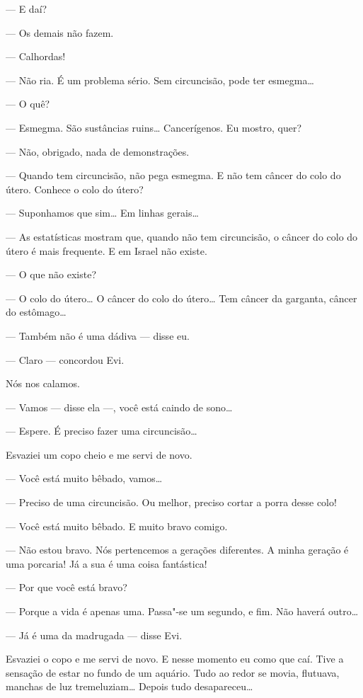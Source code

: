 --- E daí?

--- Os demais não fazem.

--- Calhordas!

--- Não ria. É um problema sério. Sem circuncisão, pode ter
esmegma\ldots{}

--- O quê?

--- Esmegma. São sustâncias ruins\ldots{} Cancerígenos. Eu mostro,
quer?

--- Não, obrigado, nada de demonstrações.

--- Quando tem circuncisão, não pega esmegma. E não tem câncer do
colo do útero. Conhece o colo do útero?

--- Suponhamos que sim\ldots{} Em linhas gerais\ldots{}

--- As estatísticas mostram que, quando não tem circuncisão, o
câncer do colo do útero é mais frequente. E em Israel não existe.

--- O que não existe?

--- O colo do útero\ldots{} O câncer do colo do útero\ldots{} Tem câncer da
garganta, câncer do estômago\ldots{}

--- Também não é uma dádiva --- disse eu.

--- Claro --- concordou Evi.

Nós nos calamos.

--- Vamos --- disse ela ---, você está caindo de
sono\ldots{}

--- Espere. É preciso fazer uma circuncisão\ldots{}

Esvaziei um copo cheio e me servi de novo.

--- Você está muito bêbado, vamos\ldots{}

--- Preciso de uma circuncisão. Ou melhor, preciso cortar a porra
desse colo!

--- Você está muito bêbado. E muito bravo comigo.

--- Não estou bravo. Nós pertencemos a gerações diferentes. A
minha geração é uma porcaria! Já a sua é uma coisa fantástica!

--- Por que você está bravo?

--- Porque a vida é apenas uma. Passa"-se um segundo, e fim. Não
haverá outro\ldots{}

--- Já é uma da madrugada --- disse Evi.

Esvaziei o copo e me servi de novo. E nesse momento eu como que caí.
Tive a sensação de estar no fundo de um aquário. Tudo ao redor se movia,
flutuava, manchas de luz tremeluziam\ldots{} Depois tudo desapareceu\ldots{}

